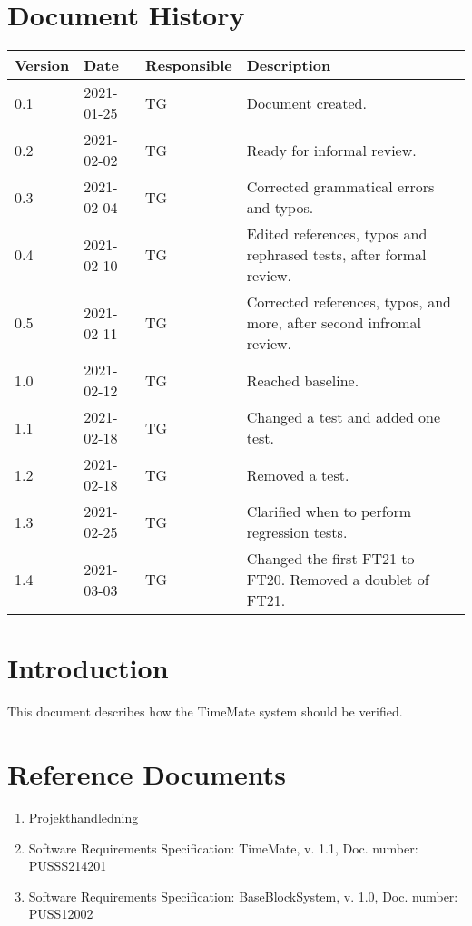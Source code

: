 \documentclass{article}
\date {#1}
\title {
    \documentNumber {02}    
    
    \documentVersion {1.4}
    
    \documentTitle {Software Verification and Validation Specification}
    \documentGroup {2}
    
    \documentResponsible {Test Group}
    \documentAuthors {Test Group}
    
    \documentDate {2021-03-03}
}
\begin{document}
\maketitle
\thispagestyle{empty}

\newpage

\tableofcontents

\newpage



\section{Document History}
\begin{tabular}{ l | l | l | l }
    Version & Date & Responsible & Description \\
    \hline
    0.1 & 2021-01-25 & TG & Document created. \\
    0.2 & 2021-02-02 & TG & Ready for informal review. \\
    0.3 & 2021-02-04 & TG & Corrected grammatical errors and typos. \\
    0.4 & 2021-02-10 & TG & Edited references, typos and rephrased tests, after formal review. \\
    0.5 & 2021-02-11 & TG & Corrected references, typos, and more, after second infromal review. \\
	1.0 & 2021-02-12 & TG & Reached baseline. \\
	1.1 & 2021-02-18 & TG & Changed a test and added one test. \\
	1.2 & 2021-02-18 & TG & Removed a test. \\
	1.3 & 2021-02-25 & TG & Clarified when to perform regression tests. \\
	1.4 & 2021-03-03 & TG & Changed the first FT21 to FT20. Removed a doublet of FT21. \\
\end{tabular}

\section{Introduction}

	This document describes how the TimeMate system should be verified. 

\section{Reference Documents}

\begin{enumerate}
  \item Projekthandledning 
  \item Software Requirements Specification: TimeMate, v. 1.1, Doc. number: PUSSS214201
  \item Software Requirements Specification: BaseBlockSystem, v. 1.0, Doc. number: PUSS12002

\end{enumerate}
\end{document}
